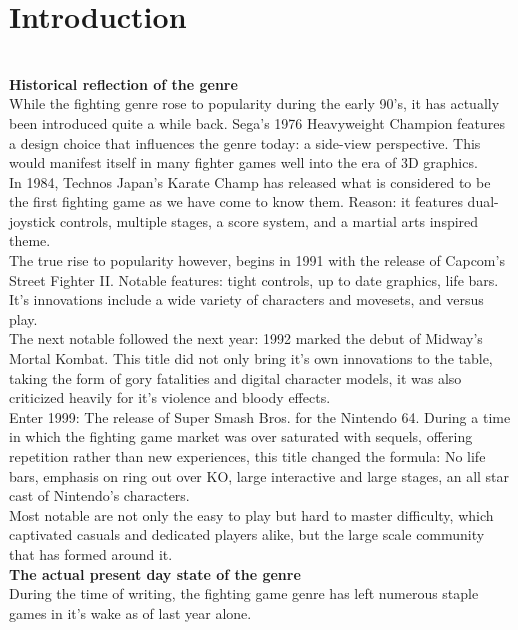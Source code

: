 \documentclass{article}
\begin{document}
\chapter{Introduction}\\
\textbf{Historical reflection of the genre} \cite{jeffdunn2012:1}\\
While the fighting genre rose to popularity during the early 90's, it has actually been introduced quite a while back. Sega's 1976 Heavyweight Champion features a design choice that influences the genre today: a side-view perspective. This would manifest itself in many fighter games well into the era of 3D graphics.\\
In 1984, Technos Japan's Karate Champ has released what is considered to be the first fighting game as we have come to know them. Reason: it features dual-joystick controls, multiple stages, a score system, and a martial arts inspired theme.\\
The true rise to popularity however, begins in 1991 with the release of Capcom's Street Fighter II. Notable features: tight controls, up to date graphics, life bars. It's innovations include a wide variety of characters and movesets, and versus play.\\
The next notable followed the next year: 1992 marked the debut of Midway's Mortal Kombat. This title did not only bring it's own innovations to the table, taking the form of gory fatalities and digital character models, it was also criticized heavily for it's violence and bloody effects.\\
Enter 1999: The release of Super Smash Bros. for the Nintendo 64. During a time in which the fighting game market was over saturated with sequels, offering repetition rather than new experiences, this title changed the formula: No life bars, emphasis on ring out over KO, large interactive and large stages, an all star cast of Nintendo's characters.\\
Most notable are not only the easy to play but hard to master difficulty, which captivated casuals and dedicated players alike, but the large scale community that has formed around it.\\
\textbf{The actual present day state of the genre}\\
During the time of writing, the fighting game genre has left numerous staple games in it's wake as of last year alone.\cite{eltonjones2017:8}\\
\end{document}
